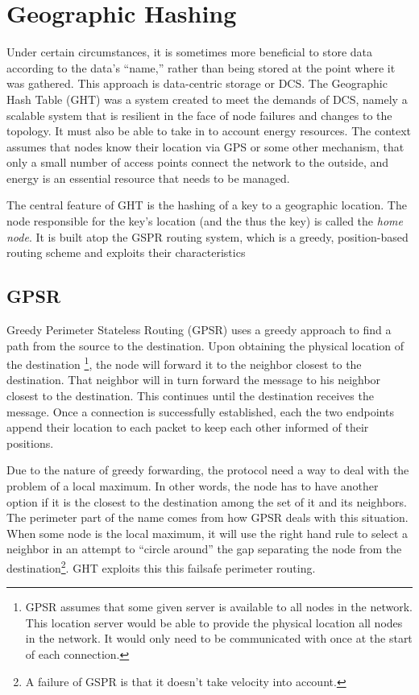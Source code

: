 \documentclass[10pt,letterpaper]{report}
\begin{document}
\section{Geographic Hashing}
Under certain circumstances, it is sometimes more beneficial to store data according to the data's ``name,'' rather than being stored at the point where it was gathered.
This approach is data-centric storage or DCS.
The Geographic Hash Table (GHT) 
\cite{ratnasamy2002ght} was a system created to meet the demands of DCS, namely a scalable system that is resilient in the face of node failures and changes to the topology.  
It must also be able to take in to account energy resources.
The context assumes that nodes know their location via GPS or some other mechanism, that only a small number of access points connect the network to the outside, and energy is an essential resource that needs to be managed.


The central feature of GHT is the hashing of a key to a geographic location.  
The node responsible for the key's location (and the thus the key) is called the \textit{home node}.  
It is built atop the GSPR \cite{karp2000gpsr} routing system, which is a greedy, position-based routing scheme and exploits their characteristics

\subsection*{GPSR}
Greedy Perimeter Stateless Routing (GPSR) \cite{karp2000gpsr} uses a greedy approach to find a path from the source to the destination.
Upon obtaining the physical location of the destination \footnote{GPSR assumes that some given server is available to all nodes in the network. This location server would be able to provide the physical location all nodes in the network. It would only need to be communicated with once at the start of each connection.}, the node will forward it to the neighbor closest to the destination. 
That neighbor will in turn forward the message to his neighbor closest to the destination.
This continues until the destination receives the message.
Once a connection is successfully established, each the two endpoints append their location to each packet to keep each other informed of their positions.

Due to the nature of greedy forwarding, the protocol need a way to deal with the problem of a local maximum. 
In other words, the node has to have another option if it is the closest to the destination among the set of it and its neighbors.
The perimeter part of the name comes from how GPSR deals with this situation.
When some node is the local maximum, it will use the right hand rule to select a neighbor in an attempt to ``circle around'' the gap separating the node from the destination\footnote{A failure of GSPR is that it doesn't take velocity into account.}.
GHT exploits this this failsafe perimeter routing.  
\end{document}
